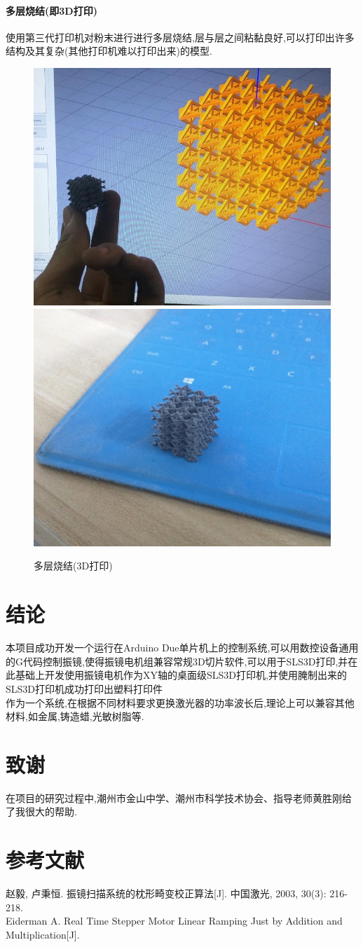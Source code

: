 \documentclass[a4paper,12pt,onecolumn,twoside]{article}
\begin{document}
\paragraph{多层烧结(即3D打印)}
使用第三代打印机对粉末进行进行多层烧结,层与层之间粘黏良好,可以打印出许多结构及其复杂(其他打印机难以打印出来)的模型.
\begin{figure}[ht]
\includegraphics[width=0.49\linewidth]{result2.jpg}
\includegraphics[width=0.49\linewidth]{result3.jpg}
\caption{多层烧结(3D打印)}
\end{figure}
\newpage
\section{结论}
本项目成功开发一个运行在Arduino Due单片机上的控制系统,可以用数控设备通用的G代码控制振镜,使得振镜电机组兼容常规3D切片软件,可以用于SLS3D打印,并在此基础上开发使用振镜电机作为XY轴的桌面级SLS3D打印机,并使用腌制出来的SLS3D打印机成功打印出塑料打印件\\
作为一个系统,在根据不同材料要求更换激光器的功率波长后,理论上可以兼容其他材料,如金属,铸造蜡,光敏树脂等.
\section{致谢}
在项目的研究过程中,潮州市金山中学、潮州市科学技术协会、指导老师黄胜刚给了我很大的帮助.
\section{参考文献}
赵毅, 卢秉恒. 振镜扫描系统的枕形畸变校正算法[J]. 中国激光, 2003, 30(3): 216-218.\\
Eiderman A. Real Time Stepper Motor Linear Ramping Just by Addition and Multiplication[J].\\
\end{document}
